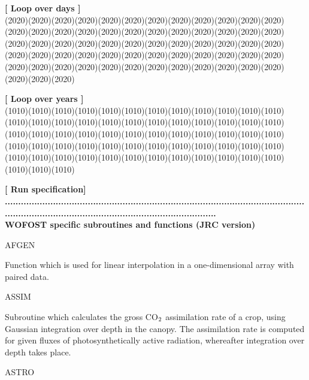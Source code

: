 \strut\hfill {\bf [ Loop over days ]}\\
 \GrBox(2020)\GrBox(2020)\GrBox(2020)\GrBox(2020)\GrBox(2020)\GrBox(2020)\GrBox(2020)\GrBox(2020)\GrBox(2020)\GrBox(2020)\GrBox(2020)\GrBox(2020)\GrBox(2020)\GrBox(2020)\GrBox(2020)\GrBox(2020)\GrBox(2020)\GrBox(2020)\GrBox(2020)\GrBox(2020)\GrBox(2020)\GrBox(2020)\GrBox(2020)\GrBox(2020)\GrBox(2020)\GrBox(2020)\GrBox(2020)\GrBox(2020)\GrBox(2020)\GrBox(2020)\GrBox(2020)\GrBox(2020)\GrBox(2020)\GrBox(2020)\GrBox(2020)\GrBox(2020)\GrBox(2020)\GrBox(2020)\GrBox(2020)\GrBox(2020)\GrBox(2020)\GrBox(2020)\GrBox(2020)\GrBox(2020)\GrBox(2020)\GrBox(2020)\GrBox(2020)\GrBox(2020)\GrBox(2020)\GrBox(2020)\GrBox(2020)\GrBox(2020)\GrBox(2020)\GrBox(2020)\GrBox(2020)\GrBox(2020)\GrBox(2020)\GrBox(2020)\GrBox(2020)\GrBox(2020)\GrBox(2020)\GrBox(2020)\GrBox(2020)\\
\strut\hfill {\bf [ Loop over years ]}\\
 \GrBox(1010)\GrBox(1010)\GrBox(1010)\GrBox(1010)\GrBox(1010)\GrBox(1010)\GrBox(1010)\GrBox(1010)\GrBox(1010)\GrBox(1010)\GrBox(1010)\GrBox(1010)\GrBox(1010)\GrBox(1010)\GrBox(1010)\GrBox(1010)\GrBox(1010)\GrBox(1010)\GrBox(1010)\GrBox(1010)\GrBox(1010)\GrBox(1010)\GrBox(1010)\GrBox(1010)\GrBox(1010)\GrBox(1010)\GrBox(1010)\GrBox(1010)\GrBox(1010)\GrBox(1010)\GrBox(1010)\GrBox(1010)\GrBox(1010)\GrBox(1010)\GrBox(1010)\GrBox(1010)\GrBox(1010)\GrBox(1010)\GrBox(1010)\GrBox(1010)\GrBox(1010)\GrBox(1010)\GrBox(1010)\GrBox(1010)\GrBox(1010)\GrBox(1010)\GrBox(1010)\GrBox(1010)\GrBox(1010)\GrBox(1010)\GrBox(1010)\GrBox(1010)\GrBox(1010)\GrBox(1010)\GrBox(1010)\GrBox(1010)\GrBox(1010)\GrBox(1010)\GrBox(1010)\GrBox(1010)\GrBox(1010)\GrBox(1010)\GrBox(1010)\\
\strut\hfill {\bf [ Run specification]}\\
{\bf ...............................................................................................................................................................................................\-}\\
 {\bf {\large WOFOST specific subroutines and functions (JRC version)}}

AFGEN
\testlastline

\begin{indenting}{5.08cm}
Function which is used for linear interpola\-tion in a one-di\-mensi\-onal array with paired data.
\end{indenting}
ASSIM
\testlastline

\begin{indenting}{5.08cm}
Subroutine which calculates the gross CO$_{{\rm 2}}$ assimilation rate
of a crop, using Gaussian integration over depth in the
canopy. The assimilation rate is computed for given fluxes of
photosyntheti\-cally active radiation, whereafter integration
over depth takes place.
\end{indenting}
ASTRO
\testlastline

